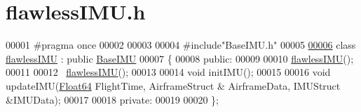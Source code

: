 \hypertarget{flawless_i_m_u_8h_source}{}\section{flawless\+I\+M\+U.\+h}
\label{flawless_i_m_u_8h_source}

\begin{DoxyCode}
00001 \textcolor{preprocessor}{#pragma once}
00002 
00003 
00004 \textcolor{preprocessor}{#include"BaseIMU.h"}
00005 
\hyperlink{classflawless_i_m_u}{00006} \textcolor{keyword}{class }\hyperlink{classflawless_i_m_u}{flawlessIMU} : \textcolor{keyword}{public} \hyperlink{class_base_i_m_u}{BaseIMU}
00007 \{
00008 \textcolor{keyword}{public}:
00009 
00010     \hyperlink{classflawless_i_m_u}{flawlessIMU}();
00011 
00012     ~\hyperlink{classflawless_i_m_u}{flawlessIMU}();
00013 
00014     \textcolor{keywordtype}{void} initIMU();
00015 
00016     \textcolor{keywordtype}{void} updateIMU(\hyperlink{group___tools_ga3f1431cb9f76da10f59246d1d743dc2c}{Float64} FlightTime, AirframeStruct & AirframeData, IMUStruct &IMUData);
00017 
00018 \textcolor{keyword}{private}:
00019 
00020 \};
\end{DoxyCode}
